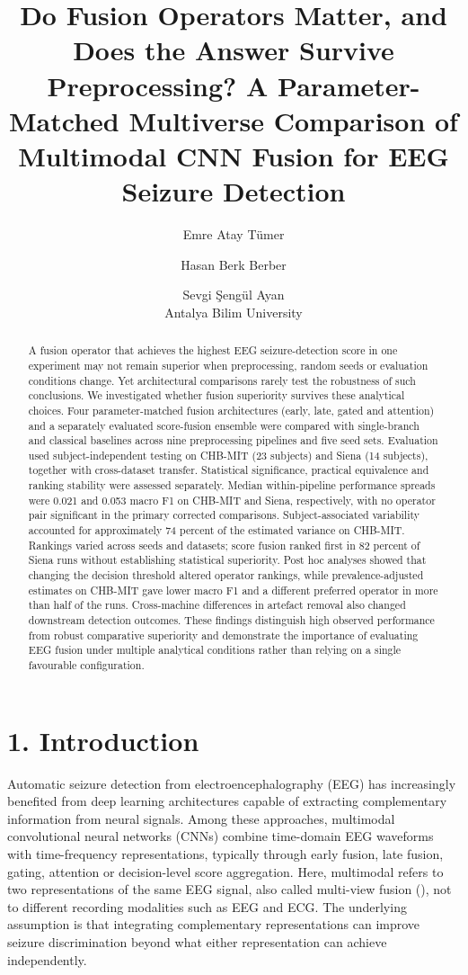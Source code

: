 \documentclass[11pt,a4paper]{article}
\title{Do Fusion Operators Matter, and Does the Answer Survive Preprocessing? A Parameter-Matched Multiverse Comparison of Multimodal CNN Fusion for EEG Seizure Detection}
\author{Emre Atay Tümer \and Hasan Berk Berber \and Sevgi Şengül Ayan\\[4pt]
  \normalsize Antalya Bilim University}
\date{}
\begin{document}
\maketitle


\begin{abstract}
A fusion operator that achieves the highest EEG seizure-detection score in one
experiment may not remain superior when preprocessing, random seeds or evaluation
conditions change. Yet architectural comparisons rarely test the robustness of such
conclusions. We investigated whether fusion superiority survives these analytical
choices. Four parameter-matched fusion architectures (early, late, gated and attention)
and a separately evaluated score-fusion ensemble were compared with single-branch and
classical baselines across nine preprocessing pipelines and five seed sets. Evaluation
used subject-independent testing on CHB-MIT (23 subjects) and Siena (14 subjects),
together with cross-dataset transfer. Statistical significance, practical equivalence
and ranking stability were assessed separately. Median within-pipeline performance
spreads were 0.021 and 0.053 macro F1 on CHB-MIT and Siena, respectively, with no
operator pair significant in the primary corrected comparisons. Subject-associated
variability accounted for approximately 74 percent of the estimated variance on CHB-MIT.
Rankings varied across seeds and datasets; score fusion ranked first in 82 percent of
Siena runs without establishing statistical superiority. Post hoc analyses showed that
changing the decision threshold altered operator rankings, while prevalence-adjusted
estimates on CHB-MIT gave lower macro F1 and a different preferred operator in more than
half of the runs. Cross-machine differences in artefact removal also changed downstream
detection outcomes. These findings distinguish high observed performance from robust
comparative superiority and demonstrate the importance of evaluating EEG fusion under
multiple analytical conditions rather than relying on a single favourable configuration.
\end{abstract}

\section{1. Introduction}\label{introduction}

Automatic seizure detection from electroencephalography (EEG) has increasingly benefited
from deep learning architectures capable of extracting complementary information from
neural signals. Among these approaches, multimodal convolutional neural networks (CNNs)
combine time-domain EEG waveforms with time-frequency representations, typically through
early fusion, late fusion, gating, attention or decision-level score aggregation. Here,
multimodal refers to two representations of the same EEG signal, also called multi-view
fusion (\citealp{Tian_2019}), not to different recording modalities such as EEG and ECG. The
underlying assumption is that integrating complementary representations can improve
seizure discrimination beyond what either representation can achieve independently.
\end{document}
